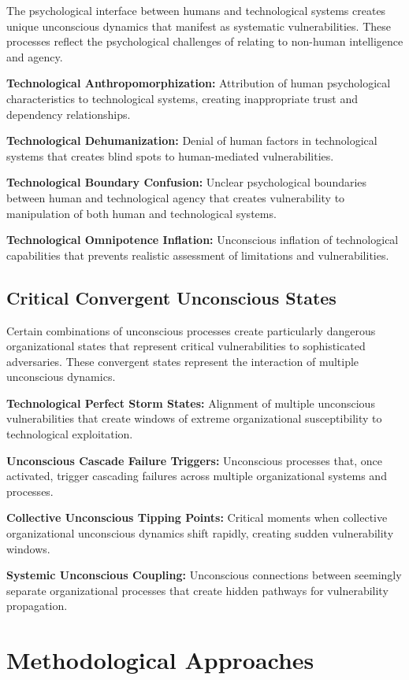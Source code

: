 \documentclass[10pt, twocolumn]{article}
\begin{document}
The psychological interface between humans and technological systems creates unique unconscious dynamics that manifest as systematic vulnerabilities. These processes reflect the psychological challenges of relating to non-human intelligence and agency.

\textbf{Technological Anthropomorphization:} Attribution of human psychological characteristics to technological systems, creating inappropriate trust and dependency relationships.

\textbf{Technological Dehumanization:} Denial of human factors in technological systems that creates blind spots to human-mediated vulnerabilities.

\textbf{Technological Boundary Confusion:} Unclear psychological boundaries between human and technological agency that creates vulnerability to manipulation of both human and technological systems.

\textbf{Technological Omnipotence Inflation:} Unconscious inflation of technological capabilities that prevents realistic assessment of limitations and vulnerabilities.

\subsection{Critical Convergent Unconscious States}

Certain combinations of unconscious processes create particularly dangerous organizational states that represent critical vulnerabilities to sophisticated adversaries. These convergent states represent the interaction of multiple unconscious dynamics.

\textbf{Technological Perfect Storm States:} Alignment of multiple unconscious vulnerabilities that create windows of extreme organizational susceptibility to technological exploitation.

\textbf{Unconscious Cascade Failure Triggers:} Unconscious processes that, once activated, trigger cascading failures across multiple organizational systems and processes.

\textbf{Collective Unconscious Tipping Points:} Critical moments when collective organizational unconscious dynamics shift rapidly, creating sudden vulnerability windows.

\textbf{Systemic Unconscious Coupling:} Unconscious connections between seemingly separate organizational processes that create hidden pathways for vulnerability propagation.

\section{Methodological Approaches}
\end{document}
